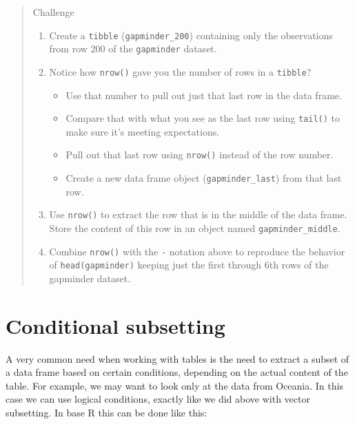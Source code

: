 \documentclass[
]{book}
\providecommand{\tightlist}{%
  \setlength{\itemsep}{0pt}\setlength{\parskip}{0pt}}
\begin{document}
\begin{quote}
Challenge

\begin{enumerate}
\def\labelenumi{\arabic{enumi}.}
\item
  Create a \texttt{tibble} (\texttt{gapminder\_200}) containing only the observations from
  row 200 of the \texttt{gapminder} dataset.
\item
  Notice how \texttt{nrow()} gave you the number of rows in a \texttt{tibble}?

  \begin{itemize}
  \tightlist
  \item
    Use that number to pull out just that last row in the data frame.
  \item
    Compare that with what you see as the last row using \texttt{tail()} to make
    sure it's meeting expectations.
  \item
    Pull out that last row using \texttt{nrow()} instead of the row number.
  \item
    Create a new data frame object (\texttt{gapminder\_last}) from that last row.
  \end{itemize}
\item
  Use \texttt{nrow()} to extract the row that is in the middle of the data
  frame. Store the content of this row in an object named \texttt{gapminder\_middle}.
\item
  Combine \texttt{nrow()} with the \texttt{-} notation above to reproduce the behavior of
  \texttt{head(gapminder)} keeping just the first through 6th rows of the gapminder
  dataset.
\end{enumerate}
\end{quote}

\section{Conditional subsetting}\label{conditional-subsetting-2}

A very common need when working with tables is the need to extract a subset of a data frame based on certain conditions, depending on the actual content of the table. For example, we may want to look only at the data from Oceania. In this case we can use logical conditions, exactly like we did above with vector subsetting. In base R this can be done like this:
\end{document}
